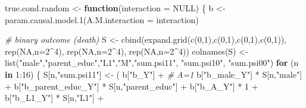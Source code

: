 \documentclass[
]{book}
\newenvironment{Shaded}{\begin{snugshade}}{\end{snugshade}}
\newcommand{\AttributeTok}[1]{\textcolor[rgb]{0.77,0.63,0.00}{#1}}
\newcommand{\CommentTok}[1]{\textcolor[rgb]{0.56,0.35,0.01}{\textit{#1}}}
\newcommand{\ConstantTok}[1]{\textcolor[rgb]{0.00,0.00,0.00}{#1}}
\newcommand{\ControlFlowTok}[1]{\textcolor[rgb]{0.13,0.29,0.53}{\textbf{#1}}}
\newcommand{\DecValTok}[1]{\textcolor[rgb]{0.00,0.00,0.81}{#1}}
\newcommand{\FunctionTok}[1]{\textcolor[rgb]{0.00,0.00,0.00}{#1}}
\newcommand{\NormalTok}[1]{#1}
\newcommand{\OtherTok}[1]{\textcolor[rgb]{0.56,0.35,0.01}{#1}}
\newcommand{\SpecialCharTok}[1]{\textcolor[rgb]{0.00,0.00,0.00}{#1}}
\newcommand{\StringTok}[1]{\textcolor[rgb]{0.31,0.60,0.02}{#1}}
\begin{document}
\begin{Shaded}
\begin{Highlighting}[]
\NormalTok{true.cond.random }\OtherTok{\textless{}{-}} \ControlFlowTok{function}\NormalTok{(}\AttributeTok{interaction =} \ConstantTok{NULL}\NormalTok{) \{}
\NormalTok{  b }\OtherTok{\textless{}{-}} \FunctionTok{param.causal.model.1}\NormalTok{(}\AttributeTok{A.M.interaction =}\NormalTok{ interaction)}
  
  \CommentTok{\# binary outcome (death)}
\NormalTok{  S }\OtherTok{\textless{}{-}} \FunctionTok{cbind}\NormalTok{(}\FunctionTok{expand.grid}\NormalTok{(}\FunctionTok{c}\NormalTok{(}\DecValTok{0}\NormalTok{,}\DecValTok{1}\NormalTok{),}\FunctionTok{c}\NormalTok{(}\DecValTok{0}\NormalTok{,}\DecValTok{1}\NormalTok{),}\FunctionTok{c}\NormalTok{(}\DecValTok{0}\NormalTok{,}\DecValTok{1}\NormalTok{),}\FunctionTok{c}\NormalTok{(}\DecValTok{0}\NormalTok{,}\DecValTok{1}\NormalTok{)), }\FunctionTok{rep}\NormalTok{(}\ConstantTok{NA}\NormalTok{,}\AttributeTok{n=}\DecValTok{2}\SpecialCharTok{\^{}}\DecValTok{4}\NormalTok{), }
             \FunctionTok{rep}\NormalTok{(}\ConstantTok{NA}\NormalTok{,}\AttributeTok{n=}\DecValTok{2}\SpecialCharTok{\^{}}\DecValTok{4}\NormalTok{), }\FunctionTok{rep}\NormalTok{(}\ConstantTok{NA}\NormalTok{,}\AttributeTok{n=}\DecValTok{2}\SpecialCharTok{\^{}}\DecValTok{4}\NormalTok{))}
  \FunctionTok{colnames}\NormalTok{(S) }\OtherTok{\textless{}{-}} \FunctionTok{list}\NormalTok{(}\StringTok{"male"}\NormalTok{,}\StringTok{"parent\_educ"}\NormalTok{,}\StringTok{"L1"}\NormalTok{,}\StringTok{"M"}\NormalTok{,}\StringTok{"sum.psi11"}\NormalTok{, }\StringTok{"sum.psi10"}\NormalTok{, }
                      \StringTok{"sum.psi00"}\NormalTok{)}
  \ControlFlowTok{for}\NormalTok{ (n }\ControlFlowTok{in} \DecValTok{1}\SpecialCharTok{:}\DecValTok{16}\NormalTok{) \{}
\NormalTok{    S[n,}\StringTok{"sum.psi11"}\NormalTok{] }\OtherTok{\textless{}{-}}\NormalTok{  ( b[}\StringTok{"b\_Y"}\NormalTok{] }\SpecialCharTok{+}                                           \CommentTok{\# A=1}
\NormalTok{                             b[}\StringTok{"b\_male\_Y"}\NormalTok{] }\SpecialCharTok{*}\NormalTok{ S[n,}\StringTok{"male"}\NormalTok{] }\SpecialCharTok{+} 
\NormalTok{                             b[}\StringTok{"b\_parent\_educ\_Y"}\NormalTok{] }\SpecialCharTok{*}\NormalTok{ S[n,}\StringTok{"parent\_educ"}\NormalTok{] }\SpecialCharTok{+} 
\NormalTok{                             b[}\StringTok{"b\_A\_Y"}\NormalTok{] }\SpecialCharTok{*} \DecValTok{1} \SpecialCharTok{+} 
\NormalTok{                             b[}\StringTok{"b\_L1\_Y"}\NormalTok{] }\SpecialCharTok{*}\NormalTok{ S[n,}\StringTok{"L1"}\NormalTok{] }\SpecialCharTok{+}

\end{Highlighting}
\end{Shaded}
\end{document}
